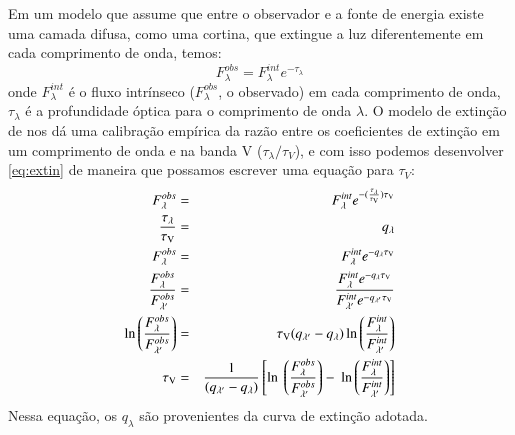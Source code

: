 Em um modelo que assume que entre o observador e a fonte de energia existe uma camada difusa, como
uma cortina, que extingue a luz diferentemente em cada comprimento de onda, temos:
\begin{equation}
	F_\lambda^{obs} = F_\lambda^{int} e^{-\tau_\lambda}
    \label{eq:extin}
\end{equation}
\noindent onde $F_\lambda^{int}$ é o fluxo intrínseco ($F_\lambda^{obs}$, o observado) em cada
comprimento de onda, $\tau_\lambda$ é a profundidade óptica para o comprimento de
onda $\lambda$. O modelo de extinção de \citet{CCM1989a} nos dá uma calibração empírica da razão
entre os coeficientes de extinção em um comprimento de onda e na banda V ($\tau_\lambda / \tau_V$),
e com isso podemos desenvolver \eqref{eq:extin} de maneira que possamos escrever uma equação para
$\tau_V$:
\begin{eqnarray}
   F_\lambda^{obs} &=& F_\lambda^{int} e^{-(\frac{\tau_\lambda}{\tauV}) \tauV} \\
   \frac{\tau_\lambda}{\tauV} &=& q_\lambda \\
   F_\lambda^{obs} &=& F_\lambda^{int} e^{-q_\lambda \tauV} \\
   \frac{F_\lambda^{obs}}{F_{\lambda^\prime}^{obs}} &=& \
 \frac{F_\lambda^{int} e^{-q_\lambda \tauV}}{F_{\lambda^\prime}^{int} e^{-q_{\lambda^\prime} \tauV}} \\
   \ln \left(\frac{F_\lambda^{obs}}{F_{\lambda^\prime}^{obs}}\right) &=& \
 \tauV (q_{\lambda^\prime} - q_\lambda) \ln \left(\frac{F_\lambda^{int}}{F_{\lambda^\prime}^{int}}\right) \\
   \tauV &=& \frac{1}{(q_{\lambda^\prime} - q_\lambda)} \left[\ln \ 
 \left(\frac{F_\lambda^{obs}}{F_{\lambda^\prime}^{obs}}\right) - \
 \ln \left(\frac{F_\lambda^{int}}{F_{\lambda^\prime}^{int}}\right)\right] 
 \label{eq:tauV}
\end{eqnarray}
\noindent Nessa equação, os $q_\lambda$ são provenientes da curva de extinção adotada.

